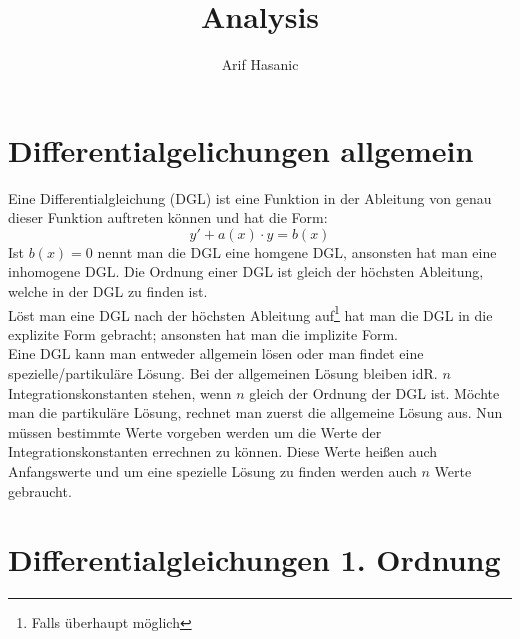 \documentclass[a4paper,10pt]{scrartcl}
\title{Analysis}
\author{Arif Hasanic}
\begin{document}
    \maketitle
    \afterpage{\null\newpage}
    \newpage
    \tableofcontents
    \newpage

    \section{Differentialgelichungen allgemein}
        Eine Differentialgleichung (DGL) ist eine Funktion in der Ableitung von genau dieser Funktion auftreten können und hat die Form: 
        \begin{equation}
            y' + a(x) \cdot y = b(x) 
        \end{equation}
        Ist \(b(x) = 0\) nennt man die DGL eine homgene DGL, ansonsten hat man eine inhomogene DGL. Die Ordnung einer DGL ist gleich der höchsten Ableitung,
        welche in der DGL zu finden ist. \\
        Löst man eine DGL nach der höchsten Ableitung auf\footnote{Falls überhaupt möglich} hat man die DGL in die explizite Form gebracht; ansonsten hat
        man die implizite Form. \\
        Eine DGL kann man entweder allgemein lösen oder man findet eine spezielle/partikuläre Lösung. Bei der allgemeinen Lösung bleiben idR. \(n\) Integrationskonstanten
        stehen, wenn \(n\) gleich der Ordnung der DGL ist. Möchte man die partikuläre Lösung, rechnet man zuerst die allgemeine Lösung aus. Nun müssen bestimmte Werte 
        vorgeben werden um die Werte der Integrationskonstanten errechnen zu können. Diese Werte heißen auch Anfangswerte und um eine spezielle Lösung zu finden werden
        auch \(n\) Werte gebraucht. 

    \section{Differentialgleichungen 1. Ordnung}
\end{document}
